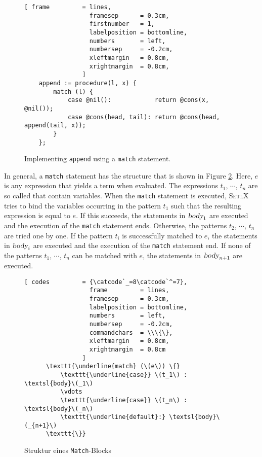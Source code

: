 \begin{figure}[!ht]
\centering
\begin{Verbatim}[ frame         = lines, 
                  framesep      = 0.3cm, 
                  firstnumber   = 1,
                  labelposition = bottomline,
                  numbers       = left,
                  numbersep     = -0.2cm,
                  xleftmargin   = 0.8cm,
                  xrightmargin  = 0.8cm,
                ]
    append := procedure(l, x) {
        match (l) {
            case @nil():            return @cons(x, @nil());
            case @cons(head, tail): return @cons(head, append(tail, x));
        }
    };
\end{Verbatim}
\vspace*{-0.3cm}
\caption{Implementing \texttt{append} using a \texttt{match} statement.}
\label{fig:append-match.stlx}
\end{figure}
In general, a \texttt{match} statement has the structure that is shown in Figure \ref{fig:match}.
Here, $e$ is any expression that yields a term when evaluated.  The expressions 
$t_1$, $\cdots$, $t_n$ are so called  that contain variables.  When the \texttt{match} statement
is executed, \textsc{SetlX} tries to bind the variables occurring in the pattern $t_1$ such that the resulting
expression is equal to $e$.  If this succeeds, the statements in  $\textsl{body}_1$ are executed and the
execution of the \texttt{match} statement ends.
Otherwise, the patterns $t_2$, $\cdots$, $t_n$ are tried one by one.  If the pattern $t_i$ is successfully
matched to $e$, the statements in $\textsl{body}_i$ are executed and the execution of the \texttt{match}
statement end.  If none of the patterns $t_1$, $\cdots$, $t_n$ can be matched with $e$, the statements in
$\textsl{body}_{n+1}$ are executed.


\begin{figure}[!ht]
  \centering
\begin{Verbatim}[ codes         = {\catcode`_=8\catcode`^=7},
                  frame         = lines, 
                  framesep      = 0.3cm, 
                  labelposition = bottomline,
                  numbers       = left,
                  numbersep     = -0.2cm,
                  commandchars  = \\\{\},
                  xleftmargin   = 0.8cm,
                  xrightmargin  = 0.8cm
                ]
      \texttt{\underline{match} (\(e\)) \{}
          \texttt{\underline{case}} \(t_1\) : \textsl{body}\(_1\) 
          \vdots
          \texttt{\underline{case}} \(t_n\) : \textsl{body}\(_n\)
          \texttt{\underline{default}:} \textsl{body}\(_{n+1}\)
      \texttt{\}}
\end{Verbatim}
\vspace*{-0.3cm}
\caption{Struktur eines \texttt{Match}-Blocks}  \label{fig:match}
\end{figure} 


